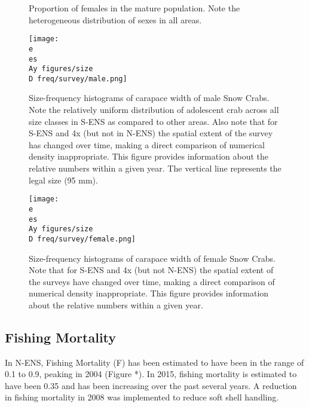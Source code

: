 \documentclass[paper=a4, fontsize=11pt]{article}
\newcommand{\D}{.}
\newcommand{\e}{/home/michelle/ecomod_data/}
\newcommand{\es}{snowcrab/}
\newcommand{\Ay}{assessments/2015/}
\begin{document}
\begin{figure}[h]
  \centering
  \caption{Proportion of females in the mature population. Note the heterogeneous distribution of sexes in all areas.}
\end{figure}
\clearpage


\begin{figure}[h]
    \centering
    \texttt{[image: \\e \\es \\Ay figures/size\\D freq/survey/male.png]}
    \caption{Size-frequency histograms of carapace width of male Snow Crabs. Note the relatively uniform distribution of adolescent crab across all size classes in S-ENS as compared to other areas. Also note that for S-ENS and 4x (but not in N-ENS) the spatial extent of the survey has changed over time, making a direct comparison of numerical density inappropriate. This figure provides information about the relative numbers within a given year. The vertical line represents the legal size (95 mm).}
\end{figure}


\begin{figure}[h]
    \centering
    \texttt{[image: \\e \\es \\Ay figures/size\\D freq/survey/female.png]}
    \caption{Size-frequency histograms of carapace width of female Snow Crabs. Note that for S-ENS and 4x (but not N-ENS) the spatial extent of the surveys have changed over time, making a direct comparison of numerical density inappropriate. This figure provides information about the relative numbers within a given year.}
\end{figure}
\clearpage

\subsection{Fishing Mortality}

In N-ENS, Fishing Mortality (F) has been estimated to have been in the range of 0.1 to 0.9, peaking in 2004 (Figure *). In 2015, fishing mortality is estimated to have been 0.35 and has been increasing over the past several years. A reduction in fishing mortality in 2008 was implemented to reduce soft shell handling.\\
\end{document}
